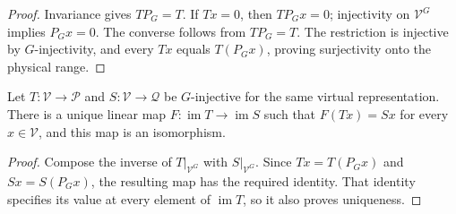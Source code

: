 \begin{proof}\leanok
    Invariance gives $T P_G=T$. If $Tx=0$, then $T P_Gx=0$;
    injectivity on $\mathcal V^G$ implies $P_Gx=0$. The converse
    follows from $T P_G=T$. The restriction is injective by
    $G$-injectivity, and every $Tx$ equals $T(P_Gx)$, proving
    surjectivity onto the physical range.
\end{proof}

\begin{lemma}%
    \label{thm:peps_g_injective_physical_range_equivalence}
    \leanok
    Let $T:\mathcal V\to\mathcal P$ and
    $S:\mathcal V\to\mathcal Q$ be $G$-injective for the same
    virtual representation. There is a unique linear map
    $F:\operatorname{im}T\to\operatorname{im}S$ such that
    $F(Tx)=Sx$ for every $x\in\mathcal V$, and this map is an
    isomorphism.
\end{lemma}

\begin{proof}\leanok
    Compose the inverse of
    $T|_{\mathcal V^G}$ with $S|_{\mathcal V^G}$.
    Since $Tx=T(P_Gx)$ and $Sx=S(P_Gx)$, the resulting map has the
    required identity. That identity specifies its value at every
    element of $\operatorname{im}T$, so it also proves uniqueness.
\end{proof}
